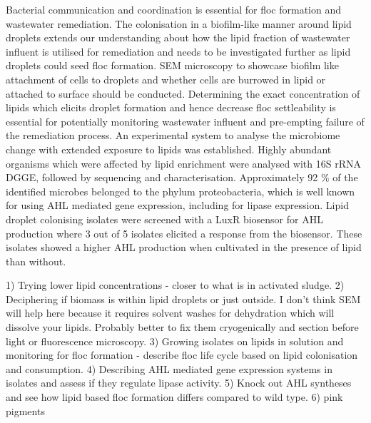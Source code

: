 Bacterial communication and coordination is essential for floc formation and wastewater remediation. The colonisation in a biofilm-like manner around lipid droplets extends our understanding about how the lipid fraction of wastewater influent is utilised for remediation and needs to be investigated further as lipid droplets could seed floc formation. SEM microscopy to showcase biofilm like attachment of cells to droplets and whether cells are burrowed in lipid or attached to surface should be conducted. Determining the exact concentration of lipids which elicits droplet formation and hence decrease floc settleability is essential for potentially monitoring wastewater influent and pre-empting failure of the remediation process. An experimental system to analyse the microbiome change with extended exposure to lipids was established. Highly abundant organisms which were affected by lipid enrichment were analysed with 16S rRNA DGGE, followed by sequencing and characterisation. Approximately 92 \% of the identified microbes belonged to the phylum proteobacteria, which is well known for using AHL mediated gene expression, including for lipase expression. Lipid droplet colonising isolates were screened with a LuxR biosensor for AHL production where 3 out of 5 isolates elicited a response from the biosensor. These isolates showed a higher AHL production when cultivated in the presence of lipid than without.


1) Trying lower lipid concentrations - closer to what is in activated sludge.
2) Deciphering if biomass is within lipid droplets or just outside. I don't think SEM will help here because it requires solvent washes for dehydration which will dissolve your lipids. Probably better to fix them cryogenically and section before light or fluorescence microscopy.
3) Growing isolates on lipids in solution and monitoring for floc formation - describe floc life cycle based on lipid colonisation and consumption.
4) Describing AHL mediated gene expression systems in isolates and assess if they regulate lipase activity.
5) Knock out AHL syntheses and see how lipid based floc formation differs compared to wild type.
6) pink pigments